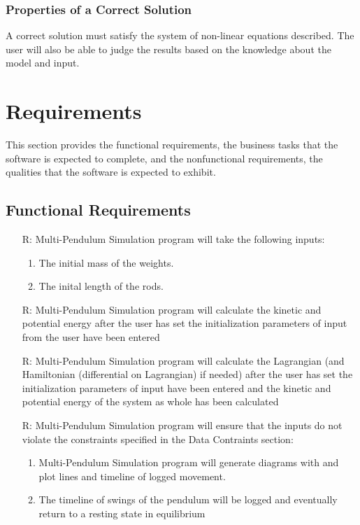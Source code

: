 \documentclass[12pt]{article}
\newcounter{reqnum} %
\newcommand{\progname}{Multi-Pendulum Simulation }
\begin{document}
\subsubsection{Properties of a Correct Solution}

\noindent
A correct solution must satisfy the system of non-linear equations described. 
The user will also be able to judge the results based on the knowledge about the model and input.

\newpage
\section{Requirements}

This section provides the functional requirements, the business tasks that the
software is expected to complete, and the nonfunctional requirements, the
qualities that the software is expected to exhibit.


\subsection{Functional Requirements}

\noindent \begin{itemize}

\item[R\refstepcounter{reqnum}\thereqnum \label{funinput}:] \progname program will 
  take the following inputs:
  \begin{enumerate} \item The initial mass of the weights. 
                    \item The inital length of the rods.
  \end{enumerate}
  
\item[R\refstepcounter{reqnum}\thereqnum \label{funkinpot}:] \progname program will 
calculate the kinetic and potential energy after the user has set the initialization 
parameters of input from the user have been entered

\item[R\refstepcounter{reqnum}\thereqnum \label{funlagham}:] \progname program will 
calculate the Lagrangian (and Hamiltonian (differential on Lagrangian) if needed) after the 
user has set the initialization parameters of input have been entered and the kinetic 
and potential energy of the system as whole has been calculated

\item[R\refstepcounter{reqnum}\thereqnum \label{funplot}:] \progname program
will ensure that the inputs do not violate the constraints specified in the Data Contraints section:
    \begin{enumerate} \item \progname program will 
generate diagrams with and plot lines and timeline of logged movement. 
\item The timeline of swings of the pendulum will be logged and eventually
return to a resting state in equilibrium
\end{enumerate}

\end{itemize}
\newpage
\end{document}
